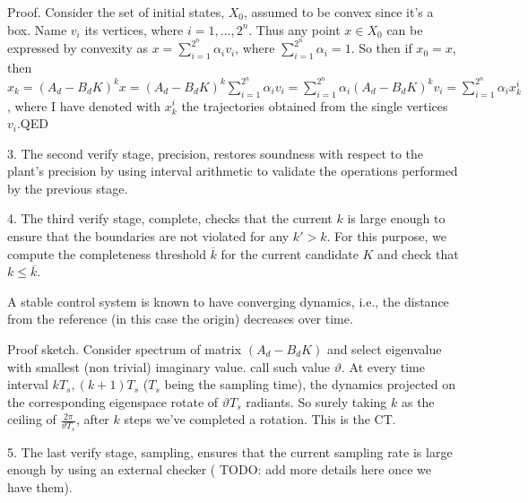 \documentclass[runningheads,a4paper]{llncs}
\newcommand{\addtodo}[1]{{\color{red} TODO: #1}}
\begin{document}

Proof. 
Consider the set of initial states, $X_0$, assumed to be convex since it's a box. 
Name $v_i$ its vertices, where $i=1,\ldots, 2^n$.  
Thus any point $x \in X_0$ can be expressed by convexity as $x = \sum_{i=1}^{2^n} \alpha_i v_i$, 
where $\sum_{i=1}^{2^n} \alpha_i =1$. 
So then if $x_0=x$, then $x_k = (A_d - B_d K)^k x = 
(A_d - B_d K)^k \sum_{i=1}^{2^n} \alpha_i v_i = 
\sum_{i=1}^{2^n} \alpha_i (A_d - B_d K)^k v_i  = 
\sum_{i=1}^{2^n} \alpha_i x_k^i$, 
where I have denoted with $x_k^i$ the trajectories obtained from the single vertices $v_i$.QED


3. The second {\sc verify} stage, {\sc precision}, 
 restores soundness with respect to the plant's precision
by using interval arithmetic \cite{moore1966interval} to validate the 
operations performed by the previous stage. 

4. The third {\sc verify} stage, {\sc complete}, checks that the
current $k$ is large enough to ensure that the boundaries are not
violated for any $k'{>}k$.  For this purpose, we compute the
completeness threshold $\overline{k}$ for the current candidate $K$
and check that $k{\leq}\overline{k}$. 

A stable control system is known to have converging dynamics, i.e., the
distance from the reference (in this case the origin) decreases over time. 


Proof sketch. 
Consider spectrum of matrix $(A_d - B_d K)$ and select eigenvalue with smallest (non trivial) imaginary value.  
call such value $\vartheta$. 
At every time interval $kT_s, (k+1)T_s$ ($T_s$ being the sampling time), 
the dynamics projected on the corresponding eigenspace rotate of $\vartheta T_s$ radiants.  
So surely taking $k$ as the ceiling of $\frac{2\pi}{\vartheta T_s}$, after $k$ steps we've completed a rotation. 
This is the CT. 

5. The last {\sc verify} stage, {\sc sampling}, 
ensures that the current sampling rate is large enough by using an 
external checker (\addtodo{add more details here once we have them}).




\end{document}
